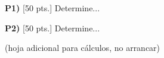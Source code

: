 \documentclass{article}
\begin{document}



\newpage
\noindent\textbf{P1) } \textsf{[50 pts.]} Determine...


\newpage
\noindent\textbf{P2) } \textsf{[50 pts.]} Determine...


\newpage

\noindent(hoja adicional para cálculos, no arrancar)
\end{document}
